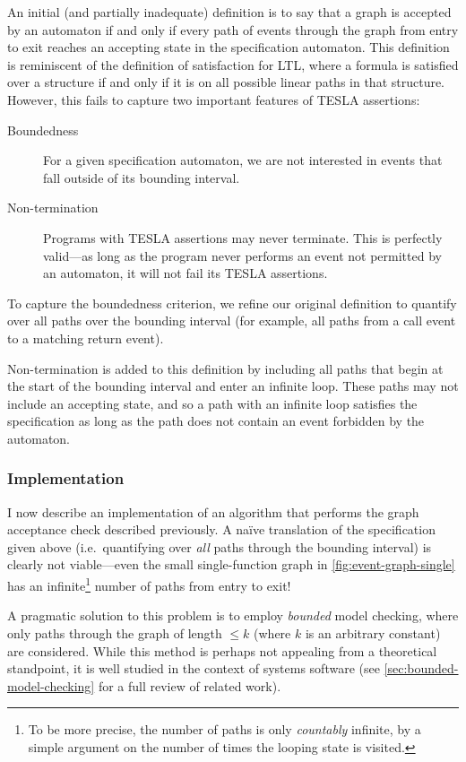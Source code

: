 An initial (and partially inadequate) definition is to say that a graph is
accepted by an automaton if and only if every path of events through the graph
from entry to exit reaches an accepting state in the specification automaton.
This definition is reminiscent of the definition of satisfaction for LTL, where
a formula is satisfied over a structure if and only if it is on all possible
linear paths in that structure. However, this fails to capture two important
features of TESLA assertions:
\begin{description}
  \item[Boundedness] For a given specification automaton, we are not interested
    in events that fall outside of its bounding interval.
  \item[Non-termination] Programs with TESLA assertions may never
    terminate. This is perfectly valid---as long as the program never
    performs an event not permitted by an automaton, it will not fail
    its TESLA assertions.
\end{description}

To capture the boundedness criterion, we refine our original definition to
quantify over all paths over the bounding interval (for example, all paths from
a call event to a matching return event).

Non-termination is added to this definition by including all paths that begin at
the start of the bounding interval and enter an infinite loop. These
paths may not include an accepting state, and so a path with an infinite
loop satisfies the specification as long as the path does not contain an
event forbidden by the automaton.

\subsubsection{Implementation}

I now describe an implementation of an algorithm that performs the graph
acceptance check described previously. A na\"ive translation of the
specification given above (i.e.\ quantifying over \emph{all} paths
through the bounding interval) is clearly not viable---even the
small single-function graph in \autoref{fig:event-graph-single} has an
infinite\footnote{To be more precise, the number of paths is only
\emph{countably} infinite, by a simple argument on the number of times
the looping state is visited.} number of paths from entry to exit!

A pragmatic solution to this problem is to employ \emph{bounded} model
checking, where only paths through the graph of length $ \leq k $ (where
$k$ is an arbitrary constant) are considered. While this method is
perhaps not appealing from a theoretical standpoint, it is well studied
in the context of systems software (see
\autoref{sec:bounded-model-checking} for a full review of related work).


